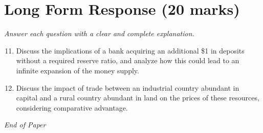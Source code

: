 \documentclass[12pt]{article}
\begin{document}
\section*{Long Form Response (20 marks)}
\textit{Answer each question with a clear and complete explanation.}
\begin{enumerate}[label=\arabic*.]
\setcounter{enumi}{10}
\item Discuss the implications of a bank acquiring an additional \$1 in deposits without a required reserve ratio, and analyze how this could lead to an infinite expansion of the money supply.
\item Discuss the impact of trade between an industrial country abundant in capital and a rural country abundant in land on the prices of these resources, considering comparative advantage.
\end{enumerate}

\vfill
\noindent\textit{End of Paper}
\end{document}

